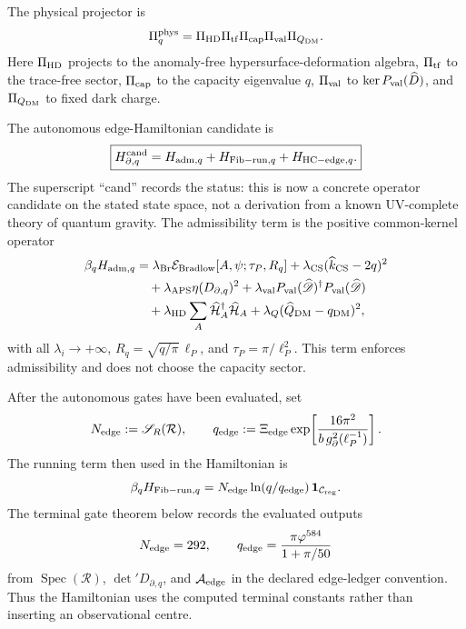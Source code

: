 \documentclass[aps,prd,reprint,nofootinbib,superscriptaddress,floatfix]{revtex4-2}
\numberwithin{equation}{section}
\theoremstyle{definition}
\theoremstyle{plain}
\begin{document}
The physical projector is
\[
\Pi_q^{\rm phys}
=
\Pi_{\rm HD}\Pi_{\rm tf}\Pi_{\rm cap}\Pi_{\rm val}\Pi_{Q_{\rm DM}} .
\]
Here \(\Pi_{\rm HD}\) projects to the anomaly-free hypersurface-deformation
algebra, \(\Pi_{\rm tf}\) to the trace-free sector, \(\Pi_{\rm cap}\) to the
capacity eigenvalue \(q\), \(\Pi_{\rm val}\) to
\(\ker P_{\rm val}(\widehat D)\), and \(\Pi_{Q_{\rm DM}}\) to fixed dark
charge.

The autonomous edge-Hamiltonian candidate is
\[
\boxed{
H_{\partial,q}^{\rm cand}
=
H_{{\rm adm},q}
+
H_{{\rm Fib-run},q}
+
H_{{\rm HC-edge},q}.
}
\]
The superscript ``cand'' records the status: this is now a concrete operator
candidate on the stated state space, not a derivation from a known
UV-complete theory of quantum gravity.
The admissibility term is the positive common-kernel operator
\[
\begin{aligned}
\beta_q H_{{\rm adm},q}
&=
\lambda_{\rm Br}\mathcal E_{\rm Bradlow}[A,\psi;\tau_P,R_q]
+\lambda_{\rm CS}(\widehat k_{\rm CS}-2q)^2\\
&\quad
+\lambda_{\rm APS}\eta(D_{\partial,q})^2
+\lambda_{\rm val}P_{\rm val}(\widehat{\mathscr D})^\dagger
P_{\rm val}(\widehat{\mathscr D})\\
&\quad
+\lambda_{\rm HD}\sum_A\widehat{\mathcal H}_A^\dagger
\widehat{\mathcal H}_A
+\lambda_Q(\widehat Q_{\rm DM}-q_{\rm DM})^2 ,
\end{aligned}
\]
with all \(\lambda_i\to+\infty\), \(R_q=\sqrt{q/\pi}\,\ell_P\), and
\(\tau_P=\pi/\ell_P^2\).  This term enforces admissibility and does not choose
the capacity sector.

After the autonomous gates have been evaluated, set
\[
N_{\rm edge}:=\mathscr S_R(\mathcal R),
\qquad
q_{\rm edge}:=
\Xi_{\rm edge}
\exp\!\left[
\frac{16\pi^2}{b\,g_\partial^2(\ell_P^{-1})}
\right].
\]
The running term then used in the Hamiltonian is
\[
\beta_q H_{{\rm Fib-run},q}
=
N_{\rm edge}\ln(q/q_{\rm edge})\,\mathbf 1_{\mathcal C_{\rm reg}} .
\]
The terminal gate theorem below records the evaluated outputs
\[
N_{\rm edge}=292,\qquad
q_{\rm edge}=\frac{\pi\varphi^{584}}{1+\pi/50}
\]
from \(\operatorname{Spec}(\mathcal R)\), \(\det{}'D_{\partial,q}\),
and \(\mathcal A_{\rm edge}\) in the declared edge-ledger convention.  Thus the
Hamiltonian uses the computed terminal constants rather than inserting an
observational centre.
\end{document}
